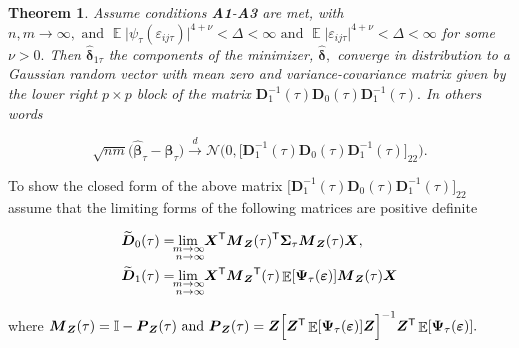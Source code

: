 \documentclass[15pt,a4paper]{article}
\DeclareMathOperator{\E}{\mathbb{E}}
\newcommand{\transpose}{{}^{\text{\sffamily T}}}
\newtheorem{theorem}{Theorem}%
\begin{document}
\begin{theorem}\label{theo1_erfe}
Assume conditions \textbf{A1}-\textbf{A3} are met, with $n,m\rightarrow\infty, \mbox{ and } \E\lvert \psi_{\tau}(\varepsilon_{ij\tau})\rvert^{4+\nu}<\Delta<\infty \mbox{ and }\E\lvert \varepsilon_{ij\tau} \rvert^{4+\nu}<\Delta<\infty$
for some $\nu>0.$ Then $\widehat{\boldsymbol{\delta}}_{1\tau}$ the components of the minimizer, $\widehat{\boldsymbol{\delta}},$ converge in distribution to a Gaussian random vector with mean zero and variance-covariance matrix given by the lower right $p\times p$ block of the matrix $\boldsymbol{D}_1^{-1}(\tau)\boldsymbol{D}_0(\tau)\boldsymbol{D}_1^{-1}(\tau).$ In others words

\begin{equation*}
    \sqrt{nm}\big(\widehat{\boldsymbol{\beta}}_{\tau}-\boldsymbol{\beta}_{\tau}\big)\xrightarrow{d} 
    \mathcal{N}\bigg(0,\Big[\boldsymbol{D}_1^{-1}(\tau)\boldsymbol{D}_0(\tau)\boldsymbol{D}_1^{-1}
    (\tau)\Big]_{22}\bigg).
\end{equation*}
\end{theorem}

To show the closed form of the above matrix \(\Big[\boldsymbol{D}_1^{-1}(\tau)\boldsymbol{D}_0(\tau)\boldsymbol{D}_1^{-1}(\tau)\Big]_{22}\) assume that the limiting forms of the following matrices are positive definite

\begin{equation*}
\begin{split}
  {}&   \widetilde{\boldsymbol{D}}_0(\tau)= \lim_{\substack{ \mathllap{m} \rightarrow \mathrlap{\infty} \\ \mathllap{n} \rightarrow \mathrlap{\infty} }} \; 
    \boldsymbol{X}\transpose \boldsymbol{M}_{\boldsymbol{Z}}(\tau)\transpose\boldsymbol{\Sigma}_{\tau}\boldsymbol{M}_{\boldsymbol{Z}}(\tau)\boldsymbol{X}, \\ 
  {}&  \widetilde{\boldsymbol{D}}_1(\tau)= \lim_{\substack{ \mathllap{m} \rightarrow \mathrlap{\infty} \\  \mathllap{n} \rightarrow \mathrlap{\infty} }} \;
    \boldsymbol{X}\transpose \boldsymbol{M}_{\boldsymbol{Z}}\transpose(\tau)\E[\boldsymbol{\Psi}_{\tau}(\boldsymbol{\varepsilon})]\boldsymbol{M}_{\boldsymbol{Z}}(\tau)\boldsymbol{X}\\
\end{split}
\end{equation*}

where \(\boldsymbol{M}_{\boldsymbol{Z}}(\tau)=\mathbb{I}-\boldsymbol{P}_{\boldsymbol{Z}}(\tau) \mbox{ and } \boldsymbol{P}_{\boldsymbol{Z}}(\tau)=\boldsymbol{Z}\Big[\boldsymbol{Z}\transpose\E[\boldsymbol{\Psi}_{\tau}(\boldsymbol{\varepsilon})] \boldsymbol{Z}\Big]^{-1} \boldsymbol{Z}\transpose\E[\boldsymbol{\Psi}_{\tau}(\boldsymbol{\varepsilon})].\)
\end{document}
